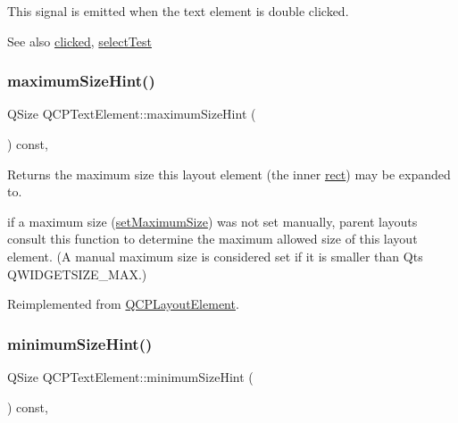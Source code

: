 This signal is emitted when the text element is double clicked.

\begin{DoxySeeAlso}{See also}
\mbox{\hyperlink{class_q_c_p_text_element_ad2246a0e701c0655623f048737298334}{clicked}}, \mbox{\hyperlink{class_q_c_p_text_element_a1e721bc2994a127ef5a8f0a514a5dbac}{select\+Test}} 
\end{DoxySeeAlso}
\mbox{\label{class_q_c_p_text_element_a65e5f4c5a852bbff48acef236048354f}} 
\subsubsection{\texorpdfstring{maximum\+Size\+Hint()}{maximumSizeHint()}}
{\footnotesize\ttfamily Q\+Size Q\+C\+P\+Text\+Element\+::maximum\+Size\+Hint (\begin{DoxyParamCaption}{ }\end{DoxyParamCaption}) const\hspace{0.3cm}{\ttfamily [protected]}, {\ttfamily [virtual]}}

Returns the maximum size this layout element (the inner \mbox{\hyperlink{class_q_c_p_layout_element_a208effccfe2cca4a0eaf9393e60f2dd4}{rect}}) may be expanded to.

if a maximum size (\mbox{\hyperlink{class_q_c_p_layout_element_a74eb5280a737ab44833d506db65efd95}{set\+Maximum\+Size}}) was not set manually, parent layouts consult this function to determine the maximum allowed size of this layout element. (A manual maximum size is considered set if it is smaller than Qt\textquotesingle{}s Q\+W\+I\+D\+G\+E\+T\+S\+I\+Z\+E\+\_\+\+M\+AX.) 

Reimplemented from \mbox{\hyperlink{class_q_c_p_layout_element_ab5ce2ba22b36d9a3b70a1be562c326e5}{Q\+C\+P\+Layout\+Element}}.

\mbox{\label{class_q_c_p_text_element_a5b6e94c79d0cd56c13cbedbb7021ea08}} 
\subsubsection{\texorpdfstring{minimum\+Size\+Hint()}{minimumSizeHint()}}
{\footnotesize\ttfamily Q\+Size Q\+C\+P\+Text\+Element\+::minimum\+Size\+Hint (\begin{DoxyParamCaption}{ }\end{DoxyParamCaption}) const\hspace{0.3cm}{\ttfamily [protected]}, {\ttfamily [virtual]}}

